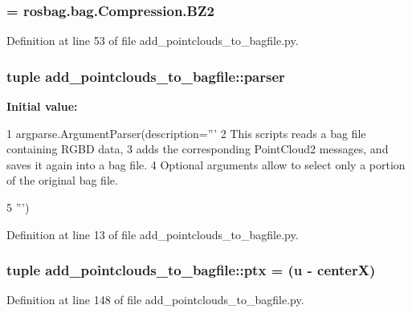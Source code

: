 \subsubsection[{param\-\_\-compression}]{ = rosbag.\-bag.\-Compression.\-B\-Z2}\label{namespaceadd__pointclouds__to__bagfile_aea382f010d0756a0d821c4700f6d0184}


\-Definition at line 53 of file add\-\_\-pointclouds\-\_\-to\-\_\-bagfile.\-py.

\subsubsection[{parser}]{\setlength{\rightskip}{0pt plus 5cm}tuple {\bf add\-\_\-pointclouds\-\_\-to\-\_\-bagfile\-::parser}}\label{namespaceadd__pointclouds__to__bagfile_aab264f7d69ed35e27b15a07733129de7}
{\bfseries \-Initial value\-:}
\begin{DoxyCode}
1 argparse.ArgumentParser(description='''
2     This scripts reads a bag file containing RGBD data, 
3     adds the corresponding PointCloud2 messages, and saves it again into a bag
       file. 
4     Optional arguments allow to select only a portion of the original bag file.
        
5     ''')
\end{DoxyCode}


\-Definition at line 13 of file add\-\_\-pointclouds\-\_\-to\-\_\-bagfile.\-py.

\subsubsection[{ptx}]{\setlength{\rightskip}{0pt plus 5cm}tuple {\bf add\-\_\-pointclouds\-\_\-to\-\_\-bagfile\-::ptx} = (u -\/ {\bf center\-X})}\label{namespaceadd__pointclouds__to__bagfile_a66588931f3df479a9db610a2c6e4f506}


\-Definition at line 148 of file add\-\_\-pointclouds\-\_\-to\-\_\-bagfile.\-py.

